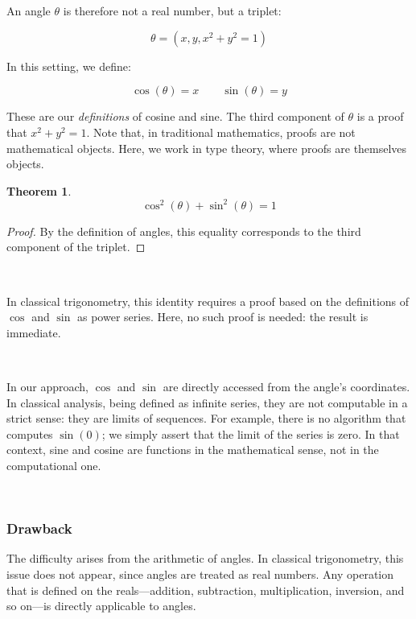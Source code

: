 \documentclass[11pt]{article}
\newtheorem{theorem}{Theorem}
\theoremstyle{definition}
\begin{document}
\

\

\noindent An angle \( \theta \) is therefore not a real number, but a triplet:

\[
\theta = (x, y, x^2 + y^2 = 1)
\]

\noindent In this setting, we define:

\[
\cos(\theta) = x \qquad \sin(\theta) = y
\]

\noindent These are our \emph{definitions} of cosine and sine. The
third component of \( \theta \) is a proof that \( x^2 + y^2 = 1
\). Note that, in traditional mathematics, proofs are not mathematical
objects. Here, we work in type theory, where proofs are themselves
objects.

\begin{theorem}
\[
\cos^2(\theta) + \sin^2(\theta) = 1
\]
\end{theorem}

\begin{proof}
By the definition of angles, this equality corresponds to the third
component of the triplet.
\end{proof}

\

\noindent In classical trigonometry, this identity requires a proof
based on the definitions of \( \cos \) and \( \sin \) as power
series. Here, no such proof is needed: the result is immediate.

\

\noindent In our approach, \( \cos \) and \( \sin \) are directly
accessed from the angle's coordinates. In classical analysis, being
defined as infinite series, they are not computable in a strict sense:
they are limits of sequences. For example, there is no algorithm that
computes \( \sin(0) \); we simply assert that the limit of the series
is zero. In that context, sine and cosine are functions in the
mathematical sense, not in the computational one.

\

\subsubsection*{Drawback}

The difficulty arises from the arithmetic of angles. In classical
trigonometry, this issue does not appear, since angles are treated as
real numbers. Any operation that is defined on the reals—addition,
subtraction, multiplication, inversion, and so on—is directly
applicable to angles.
\end{document}
